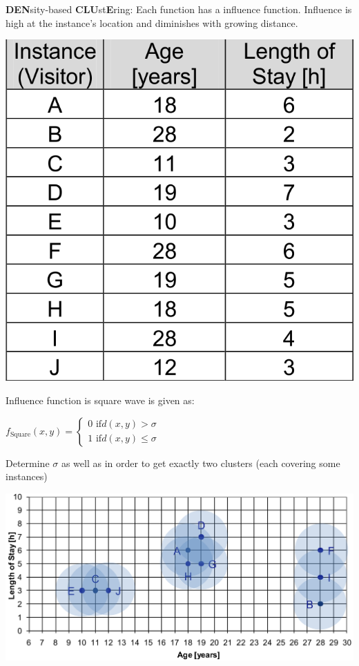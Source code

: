 \begin{breakbox}
\textbf{DEN}sity-based \textbf{CLU}st\textbf{E}ring: Each function has a influence function. Influence is high at the instance's location and diminishes with growing distance.

\begin{center}
	\includegraphics[width=.07\textwidth]{slides_images/denclue_data_table}
\end{center}

Influence function is square wave is given as:

\begin{center}
	$f_{\text{Square}} (x,y) = \begin{cases} 
    	  0 \text{ if} d(x,y) > \sigma \\
	      1 \text{ if} d(x,y) \leq \sigma
	   \end{cases}$
\end{center}

Determine $\sigma$ as well as in order to get exactly two clusters (each covering some instances)

\begin{center}
	\includegraphics[width=.15\textwidth]{slides_images/denclue_cluster}
\end{center}

\end{breakbox}

